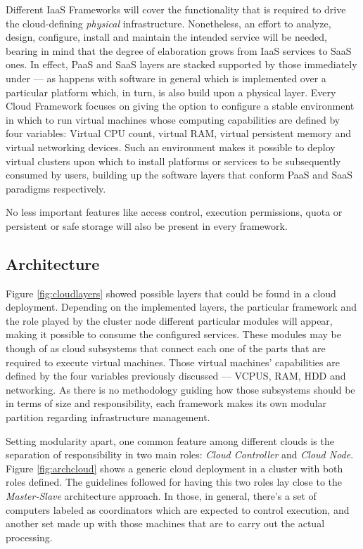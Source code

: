 Different IaaS Frameworks will cover the functionality that is required to drive the cloud-defining \emph{physical} infrastructure. Nonetheless, an effort to analyze, design, configure, install and maintain the intended service will be needed, bearing in mind that the degree of elaboration grows from IaaS services to SaaS ones. In effect, PaaS and SaaS layers are stacked supported by those immediately under --- as happens with software in general which is implemented over a particular platform which, in turn, is also build upon a physical layer. Every Cloud Framework focuses on giving the option to configure a stable environment in which to run virtual machines whose computing capabilities are defined by four variables: Virtual CPU count, virtual RAM, virtual persistent memory and virtual networking devices. Such an environment makes it possible to deploy virtual clusters upon which to install platforms or services to be subsequently consumed by users, building up the software layers that conform PaaS and SaaS paradigms respectively.

No less important features like access control, execution permissions, quota or persistent or safe storage will also be present in every framework.

\subsection{Architecture}\label{subsec:arquitecturacloud}
\noindent Figure \ref{fig:cloudlayers} showed possible layers that could be found in a cloud deployment. Depending on the implemented layers, the particular framework and the role played by the cluster node different particular modules will appear, making it possible to consume the configured services. These modules may be though of as cloud subsystems that connect each one of the parts that are required to execute virtual machines. Those virtual machines' capabilities are defined by the four variables previously discussed --- VCPUS, RAM, HDD and networking. As there is no methodology guiding how those subsystems should be in terms of size and responsibility, each framework makes its own modular partition regarding infrastructure management.

Setting modularity apart, one common feature among different clouds is the separation of responsibility in two main roles: \emph{Cloud Controller} and \emph{Cloud Node}. Figure \ref{fig:archcloud} shows a generic cloud deployment in a cluster with both roles defined. The guidelines followed for having this two roles lay close to the \emph{Master-Slave} architecture approach. In those, in general, there's a set of computers labeled as coordinators which are expected to control execution, and another set made up with those machines that are to carry out the actual processing.

